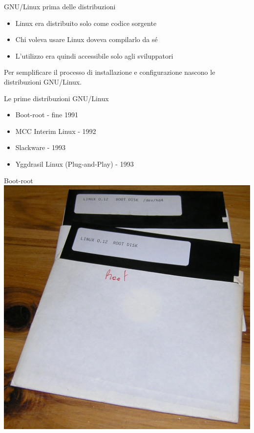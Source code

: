 \begin{frame}{GNU/Linux prima delle distribuzioni}
    \begin{itemize}
        \item Linux era distribuito solo come codice sorgente
        \item Chi voleva usare Linux doveva compilarlo da sé
        \item L'utilizzo era quindi accessibile solo agli sviluppatori
    \end{itemize}
    \hfill \break
    Per semplificare il processo di installazione e configurazione nascono le distribuzioni GNU/Linux.
\end{frame}


\begin{frame}{Le prime distribuzioni GNU/Linux}
    \begin{itemize}
        \item Boot-root - fine 1991
        \item MCC Interim Linux - 1992
        \item Slackware - 1993
        \item Yggdrasil Linux (Plug-and-Play) - 1993
    \end{itemize}
\end{frame}

\begin{frame}{Boot-root}
    \centering
    \includegraphics[scale=0.14]{images/Linux_0_12.jpg}
\end{frame}

